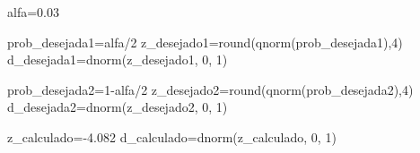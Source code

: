 \documentclass[
]{book}
\newenvironment{Shaded}{\begin{snugshade}}{\end{snugshade}}
\newcommand{\DecValTok}[1]{\textcolor[rgb]{0.00,0.00,0.81}{#1}}
\newcommand{\FloatTok}[1]{\textcolor[rgb]{0.00,0.00,0.81}{#1}}
\newcommand{\FunctionTok}[1]{\textcolor[rgb]{0.00,0.00,0.00}{#1}}
\newcommand{\NormalTok}[1]{#1}
\newcommand{\OtherTok}[1]{\textcolor[rgb]{0.56,0.35,0.01}{#1}}
\newcommand{\SpecialCharTok}[1]{\textcolor[rgb]{0.00,0.00,0.00}{#1}}
\begin{document}
\begin{Shaded}
\begin{Highlighting}[]
\NormalTok{alfa}\OtherTok{=}\FloatTok{0.03}

\NormalTok{prob\_desejada1}\OtherTok{=}\NormalTok{alfa}\SpecialCharTok{/}\DecValTok{2}
\NormalTok{z\_desejado1}\OtherTok{=}\FunctionTok{round}\NormalTok{(}\FunctionTok{qnorm}\NormalTok{(prob\_desejada1),}\DecValTok{4}\NormalTok{)}
\NormalTok{d\_desejada1}\OtherTok{=}\FunctionTok{dnorm}\NormalTok{(z\_desejado1, }\DecValTok{0}\NormalTok{, }\DecValTok{1}\NormalTok{)}

\NormalTok{prob\_desejada2}\OtherTok{=}\DecValTok{1}\SpecialCharTok{{-}}\NormalTok{alfa}\SpecialCharTok{/}\DecValTok{2}
\NormalTok{z\_desejado2}\OtherTok{=}\FunctionTok{round}\NormalTok{(}\FunctionTok{qnorm}\NormalTok{(prob\_desejada2),}\DecValTok{4}\NormalTok{)}
\NormalTok{d\_desejada2}\OtherTok{=}\FunctionTok{dnorm}\NormalTok{(z\_desejado2, }\DecValTok{0}\NormalTok{, }\DecValTok{1}\NormalTok{)}

\NormalTok{z\_calculado}\OtherTok{=}\SpecialCharTok{{-}}\FloatTok{4.082}
\NormalTok{d\_calculado}\OtherTok{=}\FunctionTok{dnorm}\NormalTok{(z\_calculado, }\DecValTok{0}\NormalTok{, }\DecValTok{1}\NormalTok{)}



\end{Highlighting}
\end{Shaded}
\end{document}
